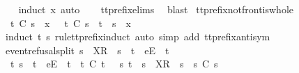 %
\isadelimproof
\ \ %
\endisadelimproof
%
\isatagproof
{}\isamarkupfalse%
\ {\isacharparenleft}induct\ x{\isacharcomma}\ auto{\isacharparenright}\isanewline
\ \ \isamarkupfalse%
\ tt{\isacharunderscore}prefix{\isachardot}elims{\isacharparenleft}{}{\isacharparenright}\ \isamarkupfalse%
\ blast%
\endisatagproof
{\isafoldproof}%
%
\isadelimproof
\isanewline
%
\endisadelimproof
\isanewline
{}\isamarkupfalse%
\ tt{\isacharunderscore}prefix{\isacharunderscore}notfront{\isacharunderscore}is{\isacharunderscore}whole{\isacharcolon}\isanewline
\ \ {\isachardoublequoteopen}t\ {\isasymle}\isactrlsub C\ s\ {\isacharat}\ {\isacharbrackleft}x{\isacharbrackright}\ {\isasymLongrightarrow}\ {\isasymnot}\ t\ {\isasymle}\isactrlsub C\ s\ {\isasymLongrightarrow}\ t\ {\isacharequal}\ s\ {\isacharat}\ {\isacharbrackleft}x{\isacharbrackright}{\isachardoublequoteclose}\isanewline
%
\isadelimproof
\ \ %
\endisadelimproof
%
\isatagproof
{}\isamarkupfalse%
\ {\isacharparenleft}induct\ t\ s\ rule{\isacharcolon}tt{\isacharunderscore}prefix{\isachardot}induct{\isacharcomma}\ auto\ simp\ add{\isacharcolon}\ tt{\isacharunderscore}prefix{\isacharunderscore}antisym{\isacharparenright}%
\endisatagproof
{\isafoldproof}%
%
\isadelimproof
\isanewline
%
\endisadelimproof
\isanewline
{}\isamarkupfalse%
\ event{\isacharunderscore}refusal{\isacharunderscore}split{\isacharcolon}\ {\isachardoublequoteopen}s{}\ {\isacharat}\ {\isacharbrackleft}X{\isacharbrackright}\isactrlsub R\ {\isacharhash}\ s{}\ {\isacharequal}\ t{}\ {\isacharat}\ {\isacharbrackleft}e{\isacharbrackright}\isactrlsub E\ {\isacharhash}\ t{}\ {\isasymLongrightarrow}\isanewline
\ \ {\isacharparenleft}{\isasymexists}t{}{\isacharprime}{\isachardot}\ s{}\ {\isacharequal}\ t{}\ {\isacharat}\ {\isacharbrackleft}e{\isacharbrackright}\isactrlsub E\ {\isacharhash}\ t{}{\isacharprime}\ {\isasymand}\ t{}{\isacharprime}\ {\isasymle}\isactrlsub C\ t{}{\isacharparenright}\ {\isasymor}\ {\isacharparenleft}{\isasymexists}\ s{}{\isacharprime}{\isachardot}\ t{}\ {\isacharequal}\ s{}\ {\isacharat}\ {\isacharbrackleft}X{\isacharbrackright}\isactrlsub R\ {\isacharhash}\ s{}{\isacharprime}\ {\isasymand}\ s{}{\isacharprime}\ {\isasymle}\isactrlsub C\ s{}{\isacharparenright}{\isachardoublequoteclose}\isanewline
%
\isadelimproof
\ \ %
\endisadelimproof
%
\isatagproof
